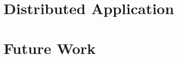 \documentclass[nips13submit_09,times,art10]{article} %
\begin{document}
\section{Distributed Application}  \label{sec:hbase}


\section{Future Work}  \label{sec:future}


\nocite{*}

\end{document}
